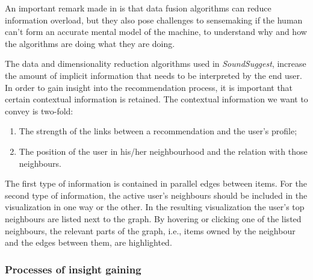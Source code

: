 An important remark made in \cite{Klein:2006:MSS:1158821.1159015} is that data fusion algorithms can reduce information overload, but they also pose challenges to sensemaking if the human can't form an accurate mental model of the machine, to understand why and how the algorithms are doing what they are doing.


The data and dimensionality reduction algorithms used in \emph{SoundSuggest}, increase the amount of implicit information that needs to be interpreted by the end user\cite{herman:2000, ware:2004}. In order to gain insight into the recommendation process, it is important that certain contextual information is retained. The contextual information we want to convey is two-fold:

\begin{enumerate}
	\item The strength of the links between a recommendation and the user's profile;
	\item The position of the user in his/her neighbourhood and the relation with those neighbours.
\end{enumerate}

The first type of information is contained in parallel edges between items. For the second type of information, the active user's neighbours should be included in the visualization in one way or the other. In the resulting visualization the user's top neighbours are listed next to the graph. By hovering or clicking one of the listed neighbours, the relevant parts of the graph, i.e., items owned by the neighbour and the edges between them, are highlighted.



\subsubsection{Processes of insight gaining}\label{chapter:literature_study:section:user:subsection:insight:subsubsection:processes}


